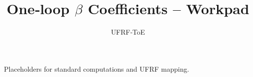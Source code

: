 \documentclass[11pt]{article}
\title{One‑loop $\beta$ Coefficients -- Workpad}
\author{UFRF‑ToE}
\begin{document}
\maketitle
Placeholders for standard computations and UFRF mapping.
\end{document}
